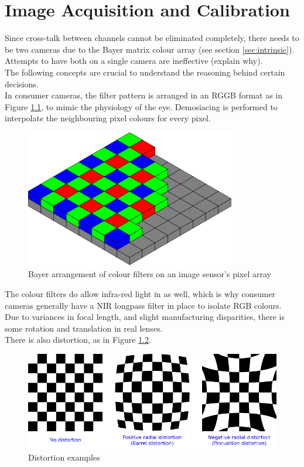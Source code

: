 \chapter{Image Acquisition and Calibration}

Since cross-talk between channels cannot be eliminated completely, there needs to be two cameras due to the Bayer matrix colour array (see section \ref{sec:intrinsic}). Attempts to have both on a single camera are ineffective (explain why).\\

The following concepts are crucial to understand the reasoning behind certain decisions.\\

In consumer cameras, the filter pattern is arranged in an RGGB format as in Figure \ref{fig:bayer}, to mimic the physiology of the eye. Demosiacing is performed to interpolate the neighbouring pixel colours for every pixel.

\begin{figure}[H]
\centering
\includegraphics[scale=0.35]{images/bayer.png}
\caption{Bayer arrangement of colour filters on an image sensor's pixel array \cite{bayer}}
\label{fig:bayer}
\end{figure}

The colour filters do allow infra-red light in as well, which is why consumer cameras generally have a NIR longpass filter in place to isolate RGB colours.\\

Due to variances in focal length, and slight manufacturing disparities, there is some rotation and translation in real lenses.\\

There is also distortion, as in Figure \ref{fig:distortion_examples}.

\begin{figure}[H]
\centering
\includegraphics[scale=0.5]{images/distortion_examples.png}
\caption{Distortion examples \cite{calib3d}}
\label{fig:distortion_examples}
\end{figure}


